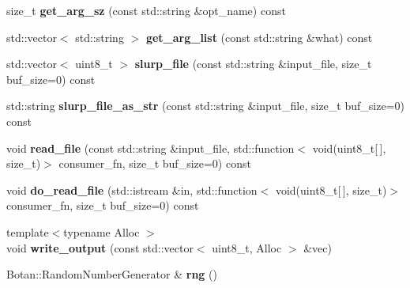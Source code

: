 \begin{DoxyCompactItemize}
\item 
\mbox{\label{class_botan___c_l_i_1_1_command_a6af697175665c4db36af7c800d64fcb2}} 
size\+\_\+t {\bfseries get\+\_\+arg\+\_\+sz} (const std\+::string \&opt\+\_\+name) const
\item 
\mbox{\label{class_botan___c_l_i_1_1_command_afec5b97c621641401beb305574ee2bd2}} 
std\+::vector$<$ std\+::string $>$ {\bfseries get\+\_\+arg\+\_\+list} (const std\+::string \&what) const
\item 
\mbox{\label{class_botan___c_l_i_1_1_command_a94922783505005e8904b17b4b3bab44a}} 
std\+::vector$<$ uint8\+\_\+t $>$ {\bfseries slurp\+\_\+file} (const std\+::string \&input\+\_\+file, size\+\_\+t buf\+\_\+size=0) const
\item 
\mbox{\label{class_botan___c_l_i_1_1_command_a1bba068b042ceea13e03023ab4828ec3}} 
std\+::string {\bfseries slurp\+\_\+file\+\_\+as\+\_\+str} (const std\+::string \&input\+\_\+file, size\+\_\+t buf\+\_\+size=0) const
\item 
\mbox{\label{class_botan___c_l_i_1_1_command_a0e37a0744ff40a35b5a1d5d440c14186}} 
void {\bfseries read\+\_\+file} (const std\+::string \&input\+\_\+file, std\+::function$<$ void(uint8\+\_\+t\mbox{[}$\,$\mbox{]}, size\+\_\+t)$>$ consumer\+\_\+fn, size\+\_\+t buf\+\_\+size=0) const
\item 
\mbox{\label{class_botan___c_l_i_1_1_command_a09819c0162b6f96924c26d1327b1e9f4}} 
void {\bfseries do\+\_\+read\+\_\+file} (std\+::istream \&in, std\+::function$<$ void(uint8\+\_\+t\mbox{[}$\,$\mbox{]}, size\+\_\+t)$>$ consumer\+\_\+fn, size\+\_\+t buf\+\_\+size=0) const
\item 
\mbox{\label{class_botan___c_l_i_1_1_command_a66a476267cce49499a900a808f4d9796}} 
{\footnotesize template$<$typename Alloc $>$ }\\void {\bfseries write\+\_\+output} (const std\+::vector$<$ uint8\+\_\+t, Alloc $>$ \&vec)
\item 
\mbox{\label{class_botan___c_l_i_1_1_command_a798c2ee2d83866dcf378130a2e37f232}} 
Botan\+::\+Random\+Number\+Generator \& {\bfseries rng} ()
\end{DoxyCompactItemize}


